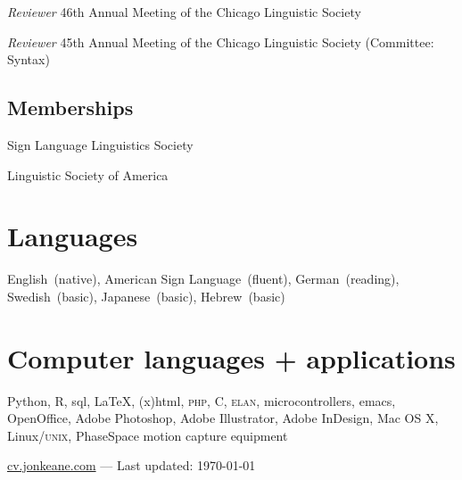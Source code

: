 \documentclass[10pt, letterpaper]{article}
\newcommand{\years}[1]{\marginpar{\scriptsize #1}}
\begin{document}
\-\years{2010}\textit{Reviewer} 46th Annual Meeting of the Chicago Linguistic Society

\-\years{2009}\textit{Reviewer} 45th Annual Meeting of the Chicago Linguistic Society (Committee: Syntax)

\subsection*{Memberships}
\label{sec:memberships}
\-\years{2013--}Sign Language Linguistics Society

\-\years{2008--}Linguistic Society of America

\section*{Languages}
\label{sec:languages}
English~(native), American Sign Language~(fluent), German~(reading), Swedish~(basic), Japanese~(basic), Hebrew~(basic)

\section*{Computer languages + applications}
\label{sec:computer}
Python, R, {\sc sql}, \LaTeX, {\sc (x)html}, \textsc{php}, C, \textsc{elan}, microcontrollers, emacs, OpenOffice, Adobe Photoshop, Adobe Illustrator, Adobe InDesign, Mac OS X, Linux/\textsc{unix}, PhaseSpace motion capture equipment

\vfill{}
\hrulefill
\begin{center}
{\footnotesize \href{http://cv.jonkeane.com}{cv.jonkeane.com} — Last updated: \isodate\today}
\end{center}
\end{document}
